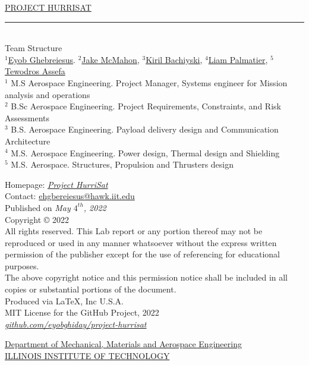 \documentclass{report}
\begin{document}
\newpage
\begin{center}
\small\textsc{\href{https://github.com/eyobghiday/project-hurrisat}{PROJECT HURRISAT }}\noindent\rule{\textwidth}{0.4pt}
\vspace{.5in}\\
\large Team Structure\\[.1in]
\small{$^1$}\href{mailto:eghebreiesus@hawk.iit.edu}{Eyob Ghebreiesus}. \small{$^2$}\href{mailto:jmcmahon2@hawk.iit.edu}{Jake McMahon}, \small{$^3$}\href{mailto:kbachiyski@hawk.iit.edu}{Kiril Bachiyski}, \small{$^4$}\href{mailto:lpalmatier@hawk.iit.edu}{Liam Palmatier}, \small{$^5$}\href{mailto:tassefa@hawk.iit.edu}{Tewodros Assefa}
\vspace{.2in}\\
\small{$^1$ M.S Aerospace Engineering. Project Manager, Systems engineer for Mission analysis and operations \\
$^2$ B.Sc Aerospace Engineering. Project Requirements, Constraints, and Risk Assessments    \\
$^3$ B.S. Aerospace Engineering. Payload delivery design and Communication Architecture\\
$^4$ M.S. Aerospace Engineering. Power design, Thermal design and Shielding \\
$^5$ M.S. Aerospace. Structures, Propulsion and Thrusters design}\\[1in]
\end{center}
Homepage: \textit{\href{https://github.com/eyobghiday/project-hurrisat}{Project HurriSat}} \\
Contact: \href{mailto:eghebreiesus@hawk.iit.edu}{ehgbereiesus@hawk.iit.edu}\\
Published on \textit{May $4^{th}$, 2022}\\[.2in]
Copyright © 2022\\
All rights reserved. This Lab report or any portion thereof may not be reproduced or used in any manner whatsoever without the express written permission of the publisher except for the use of referencing for educational purposes.\\
The above copyright notice and this permission notice shall be included in all copies or substantial portions of the document.\\[.2in]
Produced via LaTeX, Inc U.S.A.\\
MIT License for the GitHub Project, 2022\\
\href{https://github.com/eyobghiday/project-hurrisat}{\textit{github.com/eyobghiday/project-hurrisat}}\\
\begin{center}
\href{https://www.iit.edu/mmae}{Department of Mechanical, Materials and Aerospace Engineering}\\
\href{https://www.iit.edu}{ILLINOIS INSTITUTE OF TECHNOLOGY}\\
\end{center}
\end{document}
